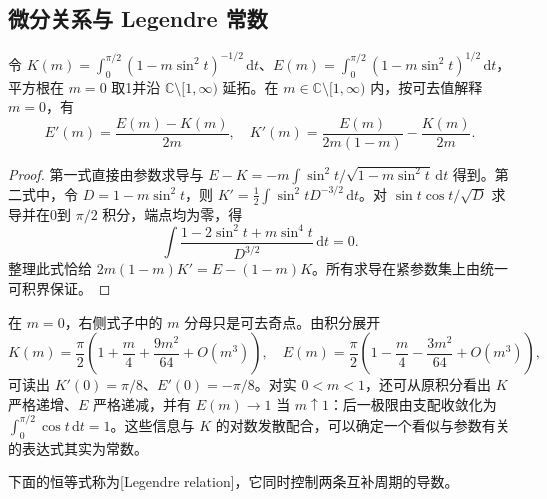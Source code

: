 \subsection{微分关系与 Legendre 常数}
\label{b3:subsec:F0403}

\begin{proposition}[微分关系]\label{b3:prop:F-elliptic-derivatives}
令 \(K(m)=\int_0^{\pi/2}(1-m\sin^2t)^{-1/2}\,\mathrm dt\)、\(E(m)=\int_0^{\pi/2}(1-m\sin^2t)^{1/2}\,\mathrm dt\)，平方根在 \(m=0\) 取1并沿 \(\mathbb C\setminus[1,\infty)\) 延拓。在 \(m\in\mathbb C\setminus[1,\infty)\) 内，按可去值解释 \(m=0\)，有
\[
 E'(m)=\frac{E(m)-K(m)}{2m},\quad
 K'(m)=\frac{E(m)}{2m(1-m)}-\frac{K(m)}{2m}.
\]
\end{proposition}
\begin{proof}
第一式直接由参数求导与
\(E-K=-m\int\sin^2t/\sqrt{1-m\sin^2t}\,\mathrm{d}t\) 得到。第二式中，令 \(D=1-m\sin^2t\)，则 \(K'=\tfrac12\int\sin^2t D^{-3/2}\,\mathrm{d}t\)。对 \(\sin t\cos t/\sqrt D\) 求导并在0到 \(\pi/2\) 积分，端点均为零，得
\[
 \int\frac{1-2\sin^2t+m\sin^4t}{D^{3/2}}\,\mathrm{d}t=0.
\]
整理此式恰给 \(2m(1-m)K'=E-(1-m)K\)。所有求导在紧参数集上由统一可积界保证。
\end{proof}

在 \(m=0\)，右侧式子中的 \(m\) 分母只是可去奇点。由积分展开
\[
K(m)=\frac\pi2\left(1+\frac m4+\frac{9m^2}{64}+O(m^3)\right),\quad
E(m)=\frac\pi2\left(1-\frac m4-\frac{3m^2}{64}+O(m^3)\right),
\]
可读出 \(K'(0)=\pi/8\)、\(E'(0)=-\pi/8\)。对实 \(0<m<1\)，还可从原积分看出 \(K\) 严格递增、\(E\) 严格递减，并有 \(E(m)\to1\) 当 \(m\uparrow1\)：后一极限由支配收敛化为 \(\int_0^{\pi/2}\cos t\,\mathrm{d}t=1\)。这些信息与 \(K\) 的对数发散配合，可以确定一个看似与参数有关的表达式其实为常数。

下面的恒等式称为[Legendre relation]，它同时控制两条互补周期的导数。


